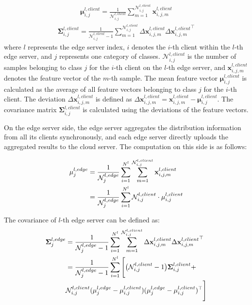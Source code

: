 \documentclass[journal]{IEEEtran}
\begin{document}
\begin{align}
  \label{client mean and covariance}
  \mathbf{\mu}^{l,client}_{i,j} = \frac{1}{\mathcal{N}^{l,client}_{i,j}} 
  \sum_{m=1}^{\mathcal{N}^{l,client}_{i,j}} \mathbf{x}^{l,client}_{i,j,m} 
\end{align}   
\begin{align}
  \mathbf{\Sigma}^{l,client}_{i,j} = \frac{1}{\mathcal{N}^{l,client}_{i,j}-1} 
  \sum_{m=1}^{\mathcal{N}^{l,client}_{i,j}} \Delta \mathbf{x}^{l,client}_{i,j,m} \Delta {\mathbf{x}^{l,client}_{i,j,m}}^\top
\end{align}
where \( l \) represents the edge server index, \( i \) denotes the \( i \)-th client within the \( l \)-th edge server, and \( j \) represents one category of classes. \( \mathcal{N}^{l,client}_{i,j} \) is the number of samples belonging to class \( j \) for the \( i \)-th client on the \( l \)-th edge server, and \( \mathbf{x}^{l,client}_{i,j,m} \) denotes the feature vector of the \( m \)-th sample. The mean feature vector \( \mathbf{\mu}^{l,client}_{i,j} \) is calculated as the average of all feature vectors belonging to class \( j \) for the \( i \)-th client. The deviation \( \Delta \mathbf{x}^{l,client}_{i,j,m} \) is defined as \( \Delta \mathbf{x}^{l,client}_{i,j,m} = \mathbf{x}^{l,client}_{i,j,m} - \mathbf{\mu}^{l,client}_{i,j} \). The covariance matrix \( \mathbf{\Sigma}^{l,client}_{i,j} \) is calculated using the deviations of the feature vectors.

On the edge server side, the edge server aggregates the distribution information from all its clients synchronously, and each edge server directly uploads the aggregated results to the cloud server. The computation on this side is as follows:  

\begin{align}
    \label{edge mean}
   \mathbf{\mu}^{l,edge}_{j} &= \frac{1}{\mathcal{N}^{l,edge}_{j}} 
   \sum_{i=1}^{N^l}\sum_{m=1}^{\mathcal{N}^{l,client}_{i,j}} \mathbf{x}^{l,client}_{i,j,m} \notag \\
   &= \frac{1}{\mathcal{N}^{l,edge}_{j}} 
   \sum_{i=1}^{N^l} \mathcal{N}^{l,client}_{i,j} \cdot \mathbf{\mu}^{l,client}_{i,j}
\end{align}

The covariance of \(l\)-th edge server can be defined as:
\begin{align}
    \label{edge covariance}
   \mathbf{\Sigma}^{l,edge}_{j} &= \frac{1}{\mathcal{N}^{l,edge}_{j}-1} \sum_{i=1}^{N^l}
   \sum_{m=1}^{\mathcal{N}^{l,client}_{i,j}} \Delta \mathbf{x}^{l,client}_{i,j,m} \Delta {\mathbf{x}^{l,client}_{i,j,m}}^\top \notag \\
   &= \frac{1}{\mathcal{N}^{l,edge}_{j}-1} \sum_{i=1}^{N^l} \Bigg[
   \big( \mathcal{N}^{l,client}_{i,j}-1\big)\mathbf{\Sigma}^{l,client}_{i,j}+ \notag\\
   & \mathcal{N}^{l,client}_{i,j}(\mathbf{\mu}^{l,edge}_{j}-\mathbf{\mu}^{l,client}_{i,j})(\mathbf{\mu}^{l,edge}_{j}-\mathbf{\mu}^{l,client}_{i,j})^\top\Bigg]
\end{align}
\end{document}
